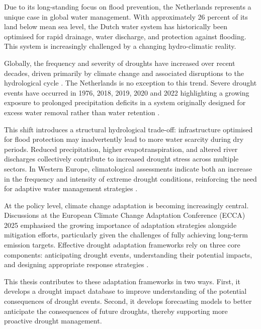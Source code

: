 Due to its long-standing focus on flood prevention, the Netherlands represents a unique case in global water management. With approximately 26 percent of its land below mean sea level, the Dutch water system has historically been optimised for rapid drainage, water discharge, and protection against flooding. This system is increasingly challenged by a changing hydro-climatic reality.

Globally, the frequency and severity of droughts have increased over recent decades, driven primarily by climate change and associated disruptions to the hydrological cycle \cite{Shyrokaya2024Advances}. The Netherlands is no exception to this trend. Severe drought events have occurred in 1976, 2018, 2019, 2020 and 2022 highlighting a growing exposure to prolonged precipitation deficits in a system originally designed for excess water removal rather than water retention \cite{KNMI2023}. 

This shift introduces a structural hydrological trade-off: infrastructure optimised for flood protection may inadvertently lead to more water scarcity during dry periods. Reduced precipitation, higher evapotranspiration, and altered river discharges collectively contribute to increased drought stress across multiple sectors. In Western Europe, climatological assessments indicate both an increase in the frequency and intensity of extreme drought conditions, reinforcing the need for adaptive water management strategies \cite{KNMI2023}.

At the policy level, climate change adaptation is becoming increasingly central. Discussions at the European Climate Change Adaptation Conference (ECCA) 2025 emphasised the growing importance of adaptation strategies alongside mitigation efforts, particularly given the challenges of fully achieving long-term emission targets. Effective drought adaptation frameworks rely on three core components: anticipating drought events, understanding their potential impacts, and designing appropriate response strategies \cite{Bulut2026Framework}.

This thesis contributes to these adaptation frameworks in two ways. First, it develops a drought impact database to improve understanding of the potential consequences of drought events. Second, it develops forecasting models to better anticipate the consequences of future droughts, thereby supporting more proactive drought management.
